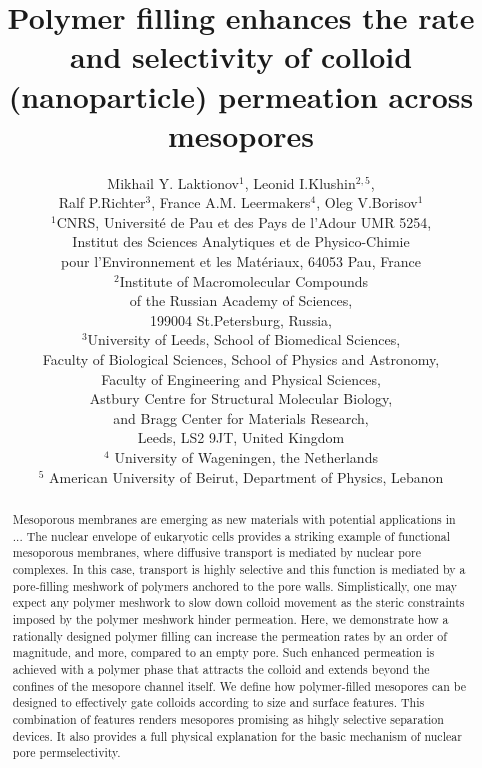 \documentclass[12pt, a4paper]{article}
\title{Polymer filling enhances the rate and selectivity of colloid (nanoparticle) permeation across mesopores}
\author{Mikhail Y. Laktionov$^1$, Leonid I.Klushin$^{2,5}$,\\Ralf P.Richter$^3$, France A.M. Leermakers$^4$, Oleg V.Borisov$^1$\\
$^{1}$CNRS, Universit\'e de Pau et des Pays de l'Adour UMR 5254,\\
Institut des Sciences Analytiques et de Physico-Chimie\\
pour l'Environnement et les Mat\'eriaux, 64053 Pau, France \\
$^{2}$Institute of Macromolecular Compounds \\
of the Russian Academy of Sciences, \\
199004 St.Petersburg, Russia,\\
$^{3}$University of Leeds, School of Biomedical Sciences, \\
Faculty of Biological Sciences, 
School of Physics and Astronomy, \\
Faculty of Engineering and Physical Sciences,\\  
Astbury Centre for Structural Molecular Biology,\\ 
and Bragg Center for Materials Research,\\ 
Leeds, LS2 9JT, United Kingdom\\
$^{4}$ University of Wageningen, the Netherlands\\
$^{5}$ American University of Beirut, Department of Physics, Lebanon
}
\date{}
\begin{document}
\maketitle

\begin{abstract}


Mesoporous membranes are emerging as new materials with potential applications in ... 
The nuclear envelope of eukaryotic cells provides a striking example of functional mesoporous membranes, where diffusive transport is mediated by nuclear pore complexes.
In this case, transport is highly selective and this function is mediated by a pore-filling meshwork of polymers anchored to the pore walls. 
Simplistically, one may expect any polymer meshwork to slow down colloid movement as the steric constraints imposed by the polymer meshwork hinder permeation.
Here, we demonstrate how a rationally designed polymer filling can increase the permeation rates by an order of magnitude, and more, compared to an empty pore.
Such enhanced permeation is achieved with a polymer phase that attracts the colloid and extends beyond the confines of the mesopore channel itself.
We define how polymer-filled mesopores can be designed to effectively gate colloids according to size and surface features. 
This combination of features renders mesopores promising as hihgly selective separation devices. It also provides a full physical explanation for the basic mechanism of nuclear pore permselectivity.

\end{abstract}

\end{document}
